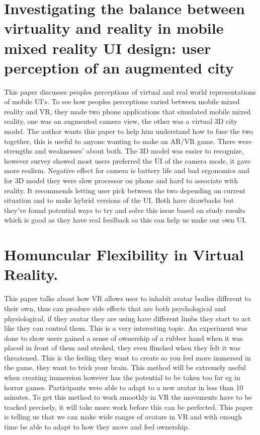 \documentclass{scrartcl}
\begin{document}
\section{Investigating the balance between virtuality and reality in mobile mixed reality UI design: user perception of an augmented city \cite{venta2014investigating} }
This paper discusses peoples perceptions of virtual and real world representations of mobile UI's. To see how peoples perceptions varied between mobile mixed reality and VR, they made two phone applications that simulated mobile mixed reality, one was an augmented camera view, the other was a virtual 3D city model. The author wants this paper to help him understand how to fuse the two together, this is useful to anyone wanting to make an AR/VR game. There were strengths and weaknesses' about both. The 3D model was easier to recognize, however survey showed most users preferred the UI of the camera mode, it gave more realism. Negative effect for camera is battery life and bad ergonomics and for 3D model they were slow processor on phone and hard to associate with reality. It recommends letting user pick between the two depending on current situation and to make hybrid versions of the UI. Both have drawbacks but they've found potential ways to try and solve this issue based on study results which is good as they have real feedback so this can help us make our own UI.

\section{Homuncular Flexibility in Virtual Reality.\cite{won2015homuncular} }
This paper talks about how VR allows user to inhabit avatar bodies different to their own, thus can produce side effects that are both psychological and physiological, if they avatar they are using have different limbs they start to act like they can control them. This is a very interesting topic. An experiment was done to show users gained a sense of ownership of a rubber hand when it was placed in front of them and stroked, they even flinched when they felt it was threatened. This is the feeling they want to create so you feel more immersed in the game, they want to trick your brain. This method will be extremely useful when creating immersion however has the potential to be taken too far eg in horror games. Participants were able to adapt to a new avatar in less than 10 minutes. To get this method to work smoothly in VR the movements have to be tracked precisely, it will take more work before this can be perfected. This paper is telling us that we can make wide ranges of avatars in VR and with enough time be able to adapt to how they move and feel ownership.
\end{document}
